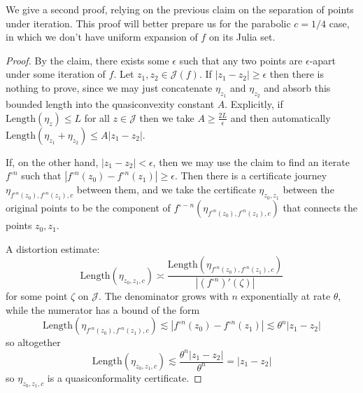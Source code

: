 We give a second proof, relying on the previous claim on the separation
of points under iteration. This proof will better prepare us for the
parabolic $c=1/4$ case, in which we don't have uniform expansion
of $f$ on its Julia set.
\begin{proof}
By the claim, there exists some $\epsilon$ such that any two points
are $\epsilon$-apart under some iteration of $f$. Let $z_{1},z_{2}\in\mathcal{J}(f)$.
If $\left|z_{1}-z_{2}\right|\geq\epsilon$ then there is nothing to
prove, since we may just concatenate $\eta_{z_{1}}$ and $\eta_{z_{2}}$
and absorb this bounded length into the quasiconvexity constant
$A$. Explicitly, if $\mathrm{Length}\left(\eta_{z}\right)\leq L$
for all $z\in\mathcal{J}$ then we take $A\geq\frac{2L}{\epsilon}$
and then automatically $\mathrm{Length}\left(\eta_{z_{1}}+\eta_{z_{2}}\right)\leq A\left|z_{1}-z_{2}\right|$.

If, on the other hand, $\left|z_{1}-z_{2}\right|<\epsilon$, then
we may use the claim to find an iterate $f^{\circ n}$ such that $\left|f^{\circ n}(z_{0})-f^{\circ n}(z_{1})\right|\geq\epsilon$.
Then there is a certificate journey $\eta_{f^{\circ n}(z_{0}),f^{\circ n}(z_{1}),c}$
between them, and we take the certificate $\eta_{z_{0},z_{1}}$ between
the original points to be the component of $f^{\circ-n}\left(\eta_{f^{\circ n}(z_{0}),f^{\circ n}(z_{1}),c}\right)$
that connects the points $z_{0},z_{1}$.

A distortion estimate: 
\[
\mathrm{Length}\left(\eta_{z_{0},z_{1},c}\right)\asymp\frac{\mathrm{Length}\left(\eta_{f^{\circ n}(z_{0}),f^{\circ n}(z_{1}),c}\right)}{\left|\left(f^{\circ n}\right)'\left(\zeta\right)\right|}
\]
 for some point $\zeta$ on $\mathcal{J}$. The denominator grows
with $n$ exponentially at rate $\theta$, while the numerator has
a bound of the form 
\[
\mathrm{Length}\left(\eta_{f^{\circ n}(z_{0}),f^{\circ n}(z_{1}),c}\right)\lesssim\left|f^{\circ n}(z_{0})-f^{\circ n}(z_{1})\right|\lesssim\theta^{n}\left|z_{1}-z_{2}\right|
\]
 so altogether 
\[
\mathrm{Length}\left(\eta_{z_{0},z_{1},c}\right)\lesssim\frac{\theta^{n}\left|z_{1}-z_{2}\right|}{\theta^{n}}=\left|z_{1}-z_{2}\right|
\]
 so $\eta_{z_{0},z_{1},c}$ is a quasiconformality certificate.


\end{proof}
